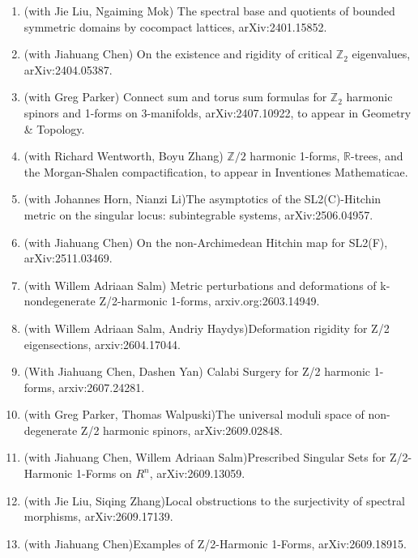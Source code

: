 \documentclass[a4paper,10pt]{article}
\begin{document}
\begin{enumerate}[leftmargin=1.5cm]
    \item (with Jie Liu, Ngaiming Mok) The spectral base and quotients of bounded symmetric domains by cocompact lattices, arXiv:2401.15852.
    \item (with Jiahuang Chen) On the existence and rigidity of critical $\mathbb{Z}_2$ eigenvalues, arXiv:2404.05387.
    \item (with Greg Parker) Connect sum and torus sum formulas for $\mathbb{Z}_2$ harmonic spinors and 1-forms on 3-manifolds, arXiv:2407.10922, to appear in Geometry \& Topology.
    \item (with Richard Wentworth, Boyu Zhang) $\mathbb{Z}/2$ harmonic 1-forms, $\mathbb{R}$-trees, and the Morgan-Shalen compactification, to appear in Inventiones Mathematicae.
    \item (with Johannes Horn, Nianzi Li)The asymptotics of the SL2(C)-Hitchin metric on the singular locus: subintegrable systems, arXiv:2506.04957.
    \item (with Jiahuang Chen) On the non-Archimedean Hitchin map for SL2(F), arXiv:2511.03469.
    \item (with Willem Adriaan Salm) Metric perturbations and deformations of k-nondegenerate Z/2-harmonic 1-forms, arxiv.org:2603.14949.
    \item (with Willem Adriaan Salm, Andriy Haydys)Deformation rigidity for Z/2 eigensections, arxiv:2604.17044.
    \item (With Jiahuang Chen, Dashen Yan) Calabi Surgery for Z/2 harmonic 1-forms, arxiv:2607.24281.
\item (with Greg Parker, Thomas Walpuski)The universal moduli space of non-degenerate Z/2 harmonic spinors,  arXiv:2609.02848.
\item (with Jiahuang Chen,  Willem Adriaan Salm)Prescribed Singular Sets for Z/2-Harmonic 1-Forms on $R^n$, arXiv:2609.13059.
\item (with Jie Liu, Siqing Zhang)Local obstructions to the surjectivity of spectral morphisms, arXiv:2609.17139.
\item (with Jiahuang Chen)Examples of Z/2-Harmonic 1-Forms, arXiv:2609.18915.
\end{enumerate}   


\end{document}
